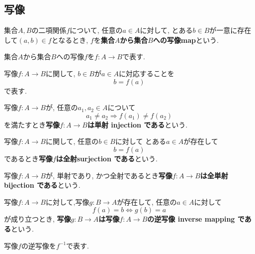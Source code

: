 \subsection{写像}
\begin{Def}
集合$A,B$の二項関係$f$について,
任意の$a\in A$に対して, とある$b\in B$が一意に存在して$(a,b)\in f$となるとき,
$f$を{\bf 集合$A$から集合$B$への写像map}という.
\end{Def}
\begin{Notation}
集合$A$から集合$B$への写像$f$を$f:A\rightarrow B$で表す.
\end{Notation}
\begin{comment}
\begin{caution}
以下では, 「{\bf 関数 function\index{かんすう@関数}}」と「写像」を同じ意味で用いる.
\end{caution}
\end{comment}
\begin{Notation}
写像$f:A\rightarrow B$に関して, $b\in B$が$a\in A$に対応することを
\[
b=f(a)
\]
で表す.
\end{Notation}
\begin{Def}
写像$f:A\rightarrow B$が,
任意の$a_1,a_2\in A$について
\[
a_1\neq a_2\Rightarrow f(a_1)\neq f(a_2)
\]
を満たすとき{\bf 写像$f:A\rightarrow B$は単射 injection である}という.
\end{Def}
\begin{Def}
写像$f:A\rightarrow B$に関して,
任意の$b\in B$に対して
とある$a\in A$が存在して
\[
b=f(a)
\]
であるとき{\bf 写像$f$は全射surjection である}という.
\end{Def}
\begin{Def}
写像$f:A\rightarrow B$が, 単射であり, かつ全射であるとき{\bf 写像$f:A\rightarrow B$は全単射 bijection である}という.
\end{Def}

\begin{Def}
写像$f:A\rightarrow B$に対して,写像$g:B\rightarrow A$が存在して, 任意の$a\in A$に対して
\[
f(a)=b \Leftrightarrow g(b)=a
\]
が成り立つとき, {\bf 写像$g:B\rightarrow A$は写像$f:A\rightarrow B$の逆写像 inverse mapping である}という.
\end{Def}
\begin{Notation}
写像$f$の逆写像を$f^{-1}$で表す.
\end{Notation}
\begin{comment}
************************************
\begin{Def}
$R$が集合$A,B$の二項関係であるとする.

任意の$a\in A$について$b,b'\in B$が存在し,
\[
aRb\land aRb'\Rightarrow b=b'
\]
が成り立つとき, {\bf $R$は$A$から$B$への部分関数\index{ぶぶんかんすう@部分関数}}という.\footnote{ここいらない気がする}
\end{Def}
\begin{Prop}
関数は部分関数である. これは定義より明らかである.
\end{Prop}
\begin{Prop}
部分関数は二項関係である. これは定義より明らかである.
\end{Prop}
************************************
\end{comment}

